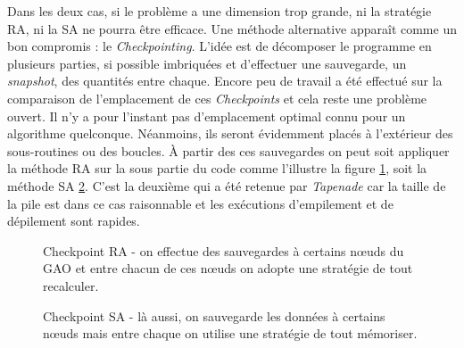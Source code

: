 Dans les deux cas, si le probl\`eme a une dimension trop grande, ni la strat\'egie RA, ni la SA ne pourra être
efficace. Une m\'ethode alternative appara\^it comme un bon compromis : le {\it Checkpointing}.
L'id\'ee est de d\'ecomposer le programme en plusieurs parties, si possible imbriqu\'ees et d'effectuer une sauvegarde, un {\it snapshot},
des quantit\'es entre chaque. Encore peu de travail a \'et\'e effectu\'e sur la comparaison de l'emplacement de ces {\it Checkpoints} et cela
reste une probl\`eme ouvert. Il n'y a pour l'instant pas d'emplacement optimal connu pour un algorithme quelconque. N\'eanmoins, 
ils seront \'evidemment plac\'es \`a l'ext\'erieur des sous-routines ou des boucles. \`A partir des ces 
sauvegardes on peut soit appliquer la m\'ethode RA sur la sous partie du code comme l'illustre la figure \ref{fig:checkpointra}, soit
la m\'ethode SA \ref{fig:checkpointsa}. C'est la deuxi\`eme qui a \'et\'e retenue par {\it Tapenade} car la taille de la pile est dans ce cas 
raisonnable et les ex\'ecutions d'empilement et de d\'epilement sont rapides.


\begin{figure}
\caption{Checkpoint RA - on effectue des sauvegardes \`a certains
n\oe uds du GAO et entre chacun de ces n\oe uds on adopte une strat\'egie de tout recalculer.}
\begin{center}
\end{center}
\label{fig:checkpointra}
\end{figure}

\begin{figure}
\caption{Checkpoint SA - l\`a aussi, on sauvegarde les donn\'ees \`a certains n\oe uds mais entre
chaque on utilise une strat\'egie de tout m\'emoriser.}





\label{fig:checkpointsa}
\end{figure}
\vspace{1cm}




